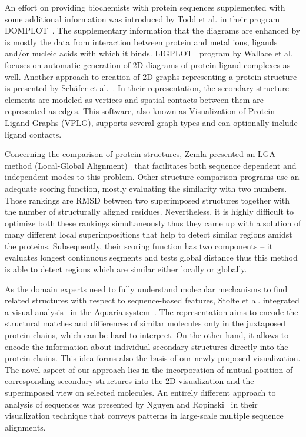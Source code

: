 \documentclass[twocolumn]{bmcart}%
\begin{document}
An effort on providing biochemists with protein sequences supplemented with some additional information was introduced by Todd et al. in their program DOMPLOT~\cite{Todd1999}.
The supplementary information that the diagrams are enhanced by is mostly the data from interaction between protein and metal ions, ligands and/or nucleic acids with which it binds.
LIGPLOT~\cite{Wallace1995} program by Wallace et al. focuses on automatic generation of 2D diagrams of protein-ligand complexes as well.
Another approach to creation of 2D graphs representing a protein structure is presented by Sch{\"a}fer et al.~\cite{Schafer2012}.
In their representation, the secondary structure elements are modeled as vertices and spatial contacts between them are represented as edges.
This software, also known as Visualization of Protein-Ligand Graphs (VPLG), supports several graph types and can optionally include ligand contacts.

Concerning the comparison of protein structures, Zemla presented an LGA method (Local-Global Alignment)~\cite{Zemla2003} that facilitates both sequence dependent and independent modes to this problem.
Other structure comparison programs use an adequate scoring function, mostly evaluating the similarity with two numbers.
Those rankings are RMSD between two superimposed structures together with the number of structurally aligned residues.
Nevertheless, it is highly difficult to optimize both these rankings simultaneously thus they came up with a solution of many different local superimpositions that help to detect similar regions amidst the proteins.
Subsequently, their scoring function has two components -- it evaluates longest continuous segments and tests global distance thus this method is able to detect regions which are similar either locally or globally.

As the domain experts need to fully understand molecular mechanisms to find related structures with respect to sequence-based features, Stolte et al. integrated a visual analysis~\cite{Stolte2015} in the Aquaria system~\cite{odonoghue2015}.
The representation aims to encode the structural matches and differences of similar molecules only in the juxtaposed protein chains, which can be hard to interpret.
On the other hand, it allows to encode the information about individual secondary structures directly into the protein chains.
This idea forms also the basis of our newly proposed visualization.
The novel aspect of our approach lies in the incorporation of mutual position of corresponding secondary structures into the 2D visualization and the superimposed view on selected molecules.
An entirely different approach to analysis of sequences was presented by Nguyen and Ropinski~\cite{Nguyen2013} in their visualization technique that conveys patterns in large-scale multiple sequence alignments.
\end{document}
